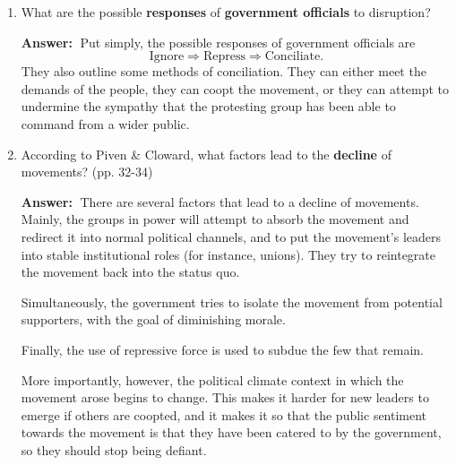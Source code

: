 \documentclass{article}
\newcommand{\answer}{\textbf{Answer:}$\;$}
\begin{document}
\begin{enumerate}[label=\arabic*)]
    \answer
    They first define disruption as the application of a negative sanction or the withdrawal of a critical contribution on which others depend.
    Then, they discuss the influence of a disruption, and they give three crucial characteristics of this:
    \begin{enumerate}
        \item Whether the contribution withheld is crucial to others.
        \item Whether or not those who have been affected have resources to be conceded.
        \item Whether the obstructionist group can protect itself adequately from reprisals.
    \end{enumerate}
    They also remark that these factors explain why the poor have so little influence in their movements.

    \item What are the possible \textbf{responses} of \textbf{government officials} to disruption?

    \answer
    Put simply, the possible responses of government officials are
    $$\text{Ignore} \Rightarrow \text{Repress} \Rightarrow \text{Conciliate}.$$
    They also outline some methods of conciliation.
    They can either meet the demands of the people, they can coopt the movement, or they can attempt to undermine the sympathy that the protesting group has been able to command from a wider public.

    \item According to Piven \& Cloward, what factors lead to the \textbf{decline} of movements? (pp. 32-34)

    \answer
    There are several factors that lead to a decline of movements.
    Mainly, the groups in power will attempt to absorb the movement and redirect it into normal political channels, and to put the movement's leaders into stable institutional roles (for instance, unions).
    They try to reintegrate the movement back into the status quo.
    
    Simultaneously, the government tries to isolate the movement from potential supporters, with the goal of diminishing morale.

    Finally, the use of repressive force is used to subdue the few that remain.

    More importantly, however, the political climate context in which the movement arose begins to change.
    This makes it harder for new leaders to emerge if others are coopted, and it makes it so that the public sentiment towards the movement is that they have been catered to by the government, so they should stop being defiant.

    
    
\end{enumerate}
 
\end{document}
